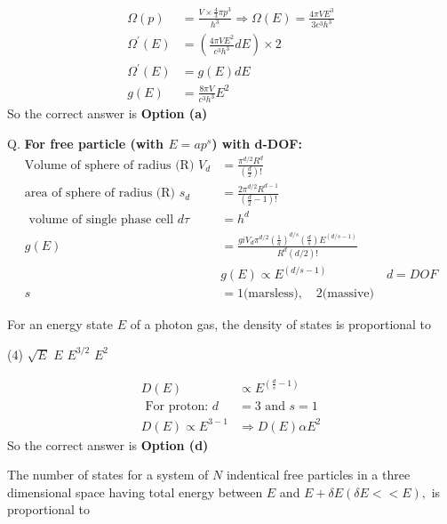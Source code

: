 \begin{answer}
	\begin{align*}
	\Omega(p)&=\frac{V \times \frac{4}{3} \pi p^{3}}{h^{3}} \Rightarrow \Omega(E)=\frac{4 \pi V E^{3}}{3 c^{3} h^{3}}\\
	\Omega^{\prime}(E)&=\left(\frac{4 \pi V E^{2}}{c^{3} h^{3}} d E\right) \times 2\\
	\Omega^{\prime}(E)&=g(E) d E\\
	g(E)&=\frac{8 \pi V}{c^{3} h^{3}} E^{2}
	\end{align*}
	So the correct answer is \textbf{Option (a)}
\end{answer}
Q. \textbf{For free particle (with $E=ap^s$) with d-DOF: }\\
\begin{align*}
\text{Volume of sphere of radius (R) }V_{d}&=\frac{\pi^{d / 2} R^{d}}{\left(\frac{d}{2}\right) !}\\
\text{area of sphere of radius (R) }s_{d}&=\frac{2 \pi^{d / 2} R^{d-1}}{\left(\frac{d}{2}-1\right) !}\\
\text{ volume of single phase cell }d \tau&=h^{d}\\
g(E)&=\frac{g i V_{d} \pi^{d / 2}\left(\frac{1}{a}\right)^{d / s}\left(\frac{d}{s}\right) E^{(d / s-1)}}{R^{d}(d / 2) !}\\
&g(E) \propto E^{(d / s-1)}\hspace{2cm}d=DOF\\
s&=1 \text{(marsless)},\quad
2 \text{(massive)}
\end{align*}
\begin{exercise}
	For an energy state $E$ of a photon gas, the density of states is proportional to 
\end{exercise}
 \begin{tasks}(4)
	\task[\textbf{a.}] $\sqrt{E}$
	\task[\textbf{b.}] $E $
	\task[\textbf{c.}]$E^{3 / 2}$
	\task[\textbf{d.}] $E^{2}$
\end{tasks}
\begin{answer}
	\begin{align*}
	D(E) &\propto E^{\left(\frac{d}{s}-1\right)}\\
	\text { For proton: } d&=3 \text { and } s=1\\
	D(E) \propto E^{3-1} &\Rightarrow D(E) \alpha E^{2}
	\end{align*}
		So the correct answer is \textbf{Option (d)}
\end{answer}
\begin{exercise}
 The number of states for a system of $N$ indentical free particles in a three dimensional space having total energy between $E$ and $E+\delta E(\delta E<<E),$ is proportional to 
\end{exercise}
